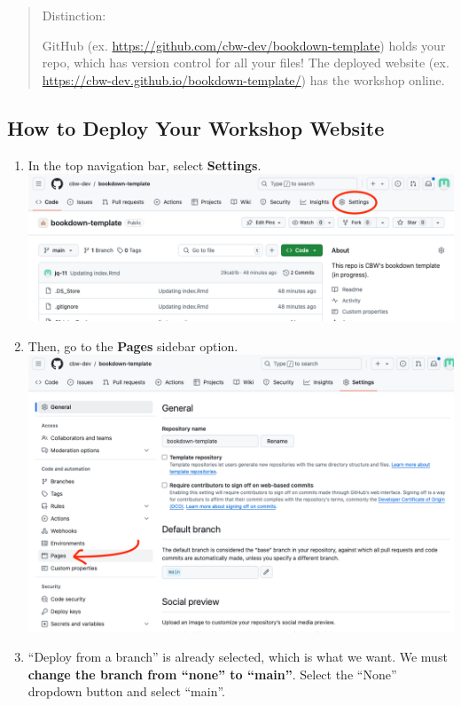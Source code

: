 \documentclass[
]{book}
\theoremstyle{definition}
\theoremstyle{definition}
\theoremstyle{definition}
\theoremstyle{definition}
\theoremstyle{remark}
\begin{document}
\begin{quote}
Distinction:

GitHub (ex. \url{https://github.com/cbw-dev/bookdown-template}) holds your repo, which has version control for all your files! The deployed website (ex. \url{https://cbw-dev.github.io/bookdown-template/}) has the workshop online.
\end{quote}

\subsection{How to Deploy Your Workshop Website}\label{deploy-website}

\begin{enumerate}
\def\labelenumi{\arabic{enumi}.}
\item
  In the top navigation bar, select \textbf{Settings}.
  \includegraphics{img/git-instruct/github-settings.png}
\item
  Then, go to the \textbf{Pages} sidebar option.
  \includegraphics{img/git-instruct/github-select-pages.png}
\item
  ``Deploy from a branch'' is already selected, which is what we want. We must \textbf{change the branch from ``none'' to ``main''}. Select the ``None'' dropdown button and select ``main''.

\end{enumerate}
\end{document}
